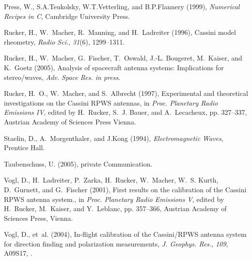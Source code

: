 \documentclass[a4paper,14pt]{extbook}
\begin{document}
\begin{thebibliography}{24}
Press, W., S.A.Teukolsky, W.T.Vetterling, and B.P.Flannery (1999),
  \textit{Numerical Recipes in C}, Cambridge University Press.

Rucker, H., W.~Macher, R.~Manning, and H.~Ladreiter (1996), Cassini model
  rheometry, \textit{Radio Sci.}, \textit{31}(6), 1299--1311.

Rucker, H., W.~Macher, G.~Fischer, T.~Oswald, J.-L. Bougeret, M.~Kaiser, and
  K.~Goetz (2005), Analysis of spacecraft antenna systems: Implications for
  stereo/waves, \textit{Adv. Space Res. in press}.

Rucker, H.~O., W.~Macher, and S.~Albrecht (1997), Experimental and theoretical
  investigations on the Cassini RPWS antennas, in \textit{Proc. Planetary Radio
  Emissions IV}, edited by H.~Rucker, S.~J. Bauer, and A.~Lecacheux, pp.
  327--337, Austrian Academy of Sciences Press Vienna.

Staelin, D., A.~Morgenthaler, and J.Kong (1994), \textit{Electromagnetic
  Waves}, Prentice Hall.

Taubenschuss, U. (2005), private Communication.

Vogl, D., H.~Ladreiter, P.~Zarka, H.~Rucker, W.~Macher, W.~S. Kurth,
  D.~Gurnett, and G.~Fischer (2001), First results on the calibration of the
  Cassini RPWS antenna system., in \textit{Proc. Planetary Radio Emissions V},
  edited by H.~Rucker, M.~Kaiser, and Y.~Leblanc, pp. 357--366, Austrian
  Academy of Sciences Press, Vienna.

Vogl, D., et~al. (2004), In-flight calibration of the Cassini/RPWS antenna
  system for direction finding and polarization measurements, \textit{J.
  Geophys. Res.}, \textit{109}, A09S17, .

\end{thebibliography}
\listoffigures
\listoftables

\printindex
\end{document}
